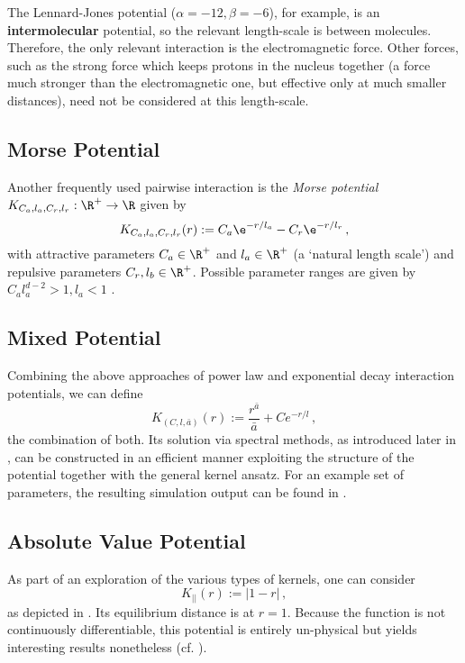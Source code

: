 The Lennard-Jones potential ($\alpha=-12, \beta=-6$), for example, is an \textbf{intermolecular} potential, so the relevant length-scale is between molecules.
Therefore, the only relevant interaction is the electromagnetic force.
Other forces, such as the strong force which keeps protons in the nucleus together (a force much stronger than the electromagnetic one, but effective only at much smaller distances), need not be considered at this length-scale.

\subsection{Morse Potential}
Another frequently used pairwise interaction is the \textit{Morse potential} $K_{C_a, l_a, C_r, l_r}: \R^+ \to \R$ given by
\begin{equation}
  K_{C_a, l_a, C_r, l_r}(r) := C_a \e^{-r / l_a} - C_r \e^{-r / l_r}\,,
  \label{eq:morse-potential}
\end{equation}
with attractive parameters $C_a \in \R^+$ and $l_a \in \R^+$ (a `natural length scale') and repulsive parameters $C_r, l_b \in \R^+$.
Possible parameter ranges are given by $C_a l_a^{d-2} > 1, l_a < 1$ \parencite{2006-self-propelled,2014-explicit-flock-solutions-for-quasi-morse-potentials}.

\subsection{Mixed Potential}
Combining the above approaches of power law and exponential decay interaction potentials, we can define
\begin{equation}
  K_{(C, l, \bar{a})}(r) := \frac{r^{\bar{a}}}{\bar{a}} + C e^{-r/l}\,,
  \label{eq:mixed-potential}
\end{equation}
the combination of both.
Its solution via spectral methods, as introduced later in , can be constructed in an efficient manner exploiting the structure of the potential together with the general kernel ansatz.
For an example set of parameters, the resulting simulation output can be found in .

\subsection{Absolute Value Potential}
As part of an exploration of the various types of kernels, one can consider
\begin{equation}
  K_{||}(r) := |1-r|\,,
  \label{eq:absvalue-potential}
\end{equation}
as depicted in .
Its equilibrium distance is at $r = 1$.
Because the function is not continuously differentiable, this potential is entirely un-physical but yields interesting results nonetheless (cf. ).

